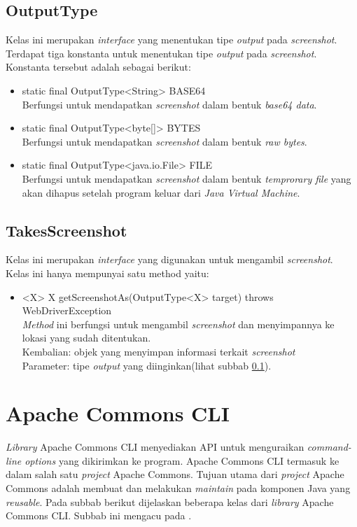 \subsection{OutputType}
\label{subsec:output_type}
Kelas ini merupakan \textit{interface} yang menentukan tipe \textit{output} pada \textit{screenshot}. Terdapat tiga konstanta untuk menentukan tipe \textit{output} pada \textit{screenshot}. Konstanta tersebut adalah sebagai berikut:
\begin{itemize}
\item static final OutputType<String> BASE64\\
Berfungsi untuk mendapatkan \textit{screenshot} dalam bentuk \textit{base64 data}.
\item static final OutputType<byte[]> BYTES\\
Berfungsi untuk mendapatkan \textit{screenshot} dalam bentuk \textit{raw bytes}.
\item static final OutputType<java.io.File> FILE\\
Berfungsi untuk mendapatkan \textit{screenshot} dalam bentuk \textit{temprorary file} yang akan dihapus setelah program keluar dari \textit{Java Virtual Machine}.
\end{itemize}


\subsection{TakesScreenshot}
\label{subsec:takes_screenshot}
Kelas ini merupakan \textit{interface} yang digunakan untuk mengambil \textit{screenshot}. Kelas ini hanya mempunyai satu method yaitu:
\begin{itemize}
\item <X> X getScreenshotAs(OutputType<X> target) throws WebDriverException\\
\textit{Method} ini berfungsi untuk mengambil \textit{screenshot} dan menyimpannya ke lokasi yang sudah ditentukan.\\
Kembalian: objek yang menyimpan informasi terkait \textit{screenshot} \\
Parameter: tipe \textit{output} yang diinginkan(lihat subbab \ref{subsec:output_type}).

\end{itemize}


\section{Apache Commons CLI}
\label{subsec:apache_cli}
\textit{Library} Apache Commons CLI menyediakan API untuk menguraikan \textit{command-line options} yang dikirimkan ke program\cite{Apache_Commons_CLI}. Apache Commons CLI termasuk ke dalam salah satu \textit{project} Apache Commons. Tujuan utama dari \textit{project} Apache Commons adalah membuat dan melakukan \textit{maintain} pada komponen Java yang \textit{reusable}. Pada subbab berikut dijelaskan beberapa kelas dari \textit{library} Apache Commons CLI. Subbab ini mengacu pada \cite{Apache_java_doc}.

